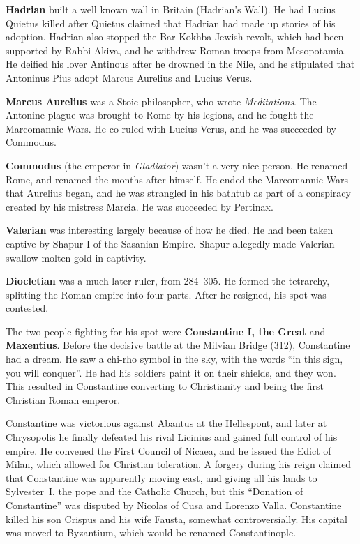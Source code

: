 \textbf{Hadrian} built a well known wall in Britain (Hadrian's Wall).
He had Lucius Quietus killed after Quietus claimed that Hadrian had made up stories of his adoption.
Hadrian also stopped the Bar Kokhba Jewish revolt, which had been supported by Rabbi Akiva,
and he withdrew Roman troops from Mesopotamia.
He deified his lover Antinous after he drowned in the Nile,
and he stipulated that Antoninus Pius adopt Marcus Aurelius and Lucius Verus.

\textbf{Marcus Aurelius} was a Stoic philosopher, who wrote \textit{Meditations}.
The Antonine plague was brought to Rome by his legions,
and he fought the Marcomannic Wars.
He co-ruled with Lucius Verus, and he was succeeded by Commodus.

\textbf{Commodus} (the emperor in \textit{Gladiator}) wasn't a very nice person.
He renamed Rome, and renamed the months after himself.
He ended the Marcomannic Wars that Aurelius began, and he was strangled in his bathtub
as part of a conspiracy created by his mistress Marcia.
He was succeeded by Pertinax.

\textbf{Valerian} was interesting largely because of how he died.
He had been taken captive by Shapur I of the Sasanian Empire.
Shapur allegedly made Valerian swallow molten gold in captivity.

\textbf{Diocletian} was a much later ruler, from 284--305.
He formed the tetrarchy, splitting the Roman empire into four parts.
After he resigned, his spot was contested.

The two people fighting for his spot were \textbf{Constantine I, the Great} and \textbf{Maxentius}.
Before the decisive battle at the Milvian Bridge (312), Constantine had a dream.
He saw a chi-rho symbol in the sky, with the words ``in this sign, you will conquer''.
He had his soldiers paint it on their shields, and they won.
This resulted in Constantine converting to Christianity and being the first Christian Roman emperor.

Constantine was victorious against Abantus at the Hellespont,
and later at Chrysopolis he finally defeated his rival Licinius and gained full control of his empire.
He convened the First Council of Nicaea, and he issued the Edict of Milan,
which allowed for Christian toleration.
A forgery during his reign claimed that Constantine was apparently moving east,
and giving all his lands to Sylvester~I, the pope and the Catholic Church,
but this ``Donation of Constantine'' was disputed by Nicolas of Cusa and Lorenzo Valla.
Constantine killed his son Crispus and his wife Fausta, somewhat controversially.
His capital was moved to Byzantium, which would be renamed Constantinople.

